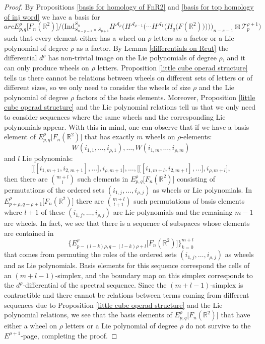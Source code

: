 \documentclass[pagebackref,colorlinks,citecolor=blue,linkcolor=blue,urlcolor=blue,filecolor=blue]{article}
\theoremstyle{definition}\newtheorem{definition}[thm]{Definition}
\theoremstyle{definition}
\newcommand{\R}{\ensuremath{\mathbb{R}}}
\begin{document}
\begin{proof}
By Propositions \ref{basis for homology of FnR2} and \ref{basis for top homology of inj word} we have a basis for 
\[
arcE^{\rho}_{p,q}\big[F_{n}(\R^{2})\big]/\Bigg(\text{Ind}^{S_{n}}_{S_{n-p-1}\times S_{p+1}}
H^{\mathcal{A}_{\rho}}\Bigg(
H^{\mathcal{A}_{\rho-1}}\bigg(\cdots H^{\mathcal{A}_{1}}\Big(H_{q}\big(F(\R^{2})\big)\Big)\bigg)\Bigg)_{n-s-1}\boxtimes \mathcal{T}^{\rho+1}_{p}\Bigg)
\]
such that every element either has a wheel on $\rho$ letters as a factor or a Lie polynomial of degree $\rho$ as a factor.
By Lemma \ref{differentials on Reut} the differential $d^{\rho}$ has non-trivial image on the Lie polynomials of degree $\rho$, and it can only produce wheels on $\rho$ letters.
Proposition \ref{little cube operad structure} tells us there cannot be relations between wheels on different sets of letters or of different sizes, so we only need to consider the wheels of size $\rho$ and the Lie polynomial of degree $\rho$ factors of the basis elements.
Moreover, Proposition \ref{little cube operad structure} and the Lie polynomial relations tell us that we only need to consider sequences where the same wheels and the corresponding Lie polynomials appear.
With this in mind, one can observe that if we have a basis element of $E^{\rho}_{p,q}\big[F_{n}(\R^{2})\big]$ that has exactly $m$ wheels on $\rho$-elements: 
\[
W(i_{1, 1}, \dots, i_{\rho, 1}), \dots, W(i_{1, m}, \dots, i_{\rho, m})
\]
and $l$ Lie polynomials: 
\[
\Big[\big[[i_{1,m+1}, i_{2, m+1}], \dots\big], i_{\rho, m+1}\Big], \dots, \Big[\big[[i_{1,m+l}, i_{2, m+l}], \dots\big], i_{\rho, m+l}\Big],
\]
then there are $\binom{m+l}{l}$ such elements in $E^{\rho}_{p,q}\big[F_{n}(\R^{2})\big]$ consisting of permutations of the ordered sets $(i_{1, j},\dots,i_{\rho, j})$ as wheels or Lie polynomials.
In $E^{\rho}_{p+\rho,q-\rho+1}\big[F_{n}(\R^{2})\big]$ there are $\binom{m+l}{l+1}$ such permutations of basis elements where $l+1$ of these $(i_{1, j},\dots,i_{\rho, j})$ are Lie polynomials and the remaining $m-1$ are wheels.
In fact, we see that there is a sequence of subspaces whose elements are contained in $$\Big\{E^{\rho}_{p-(l-k)\rho,q-(l-k)\rho+l}\big[F_{n}(\R^{2})\big]\Big\}_{k=0}^{m+l}$$ that comes from permuting the roles of the ordered sets $(i_{1, j},\dots,i_{\rho, j})$ as wheels and as Lie polynomials.
Basis elements for this sequence correspond the cells of an $(m+l-1)$-simplex, and the boundary map on this simplex corresponds to the $d^{\rho}$-differential of the spectral sequence. 
Since the $(m+l-1)$-simplex is contractible and there cannot be relations between terms coming from different sequences due to Proposition \ref{little cube operad structure} and the Lie polynomial relations, we see that the basis elements of $E^{\rho}_{p,q}\big[F_{n}(\R^{2})\big]$ that have either a wheel on $\rho$ letters or a Lie polynomial of degree $\rho$ do not survive to the $E^{\rho+1}$-page, completing the proof.
\end{proof}
\end{document}
